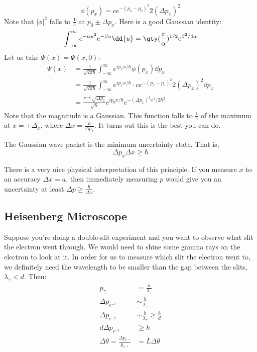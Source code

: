 \[ \phi(p_x) = c e^{-(p_x - p_0)^2}{2 (\Delta p_x)^2} \]
Note that $|\phi|^2$ falls to $\frac{1}{e}$ at $p_0 \pm \Delta p_x$. Here is a good Gaussian identity:
\[ \int_{-\infty}^{\infty} e^{-\alpha u^2} e^{-\beta u} \dd{u} = \qty(\frac{\pi}{\alpha})^{1/2} e^{\beta^2/4\alpha} \]
Let us take $\Psi(x) = \Psi(x, 0)$:
\begin{align*}
    \Psi(x) &= \frac{1}{\sqrt{2\pi\hbar}} \int_{-\infty}^{\infty} e^{i p_x x/\hbar} \phi(p_x) \dd{p_x} \\
    &= \frac{1}{\sqrt{2\pi\hbar}} \int_{-\infty}^{\infty} e^{i p_x x/\hbar} \cdot c e^{-(p_x - p_0)^2}{2 (\Delta p_x)^2} \dd{p_x} \\
    &= \frac{\pi^{-\frac{1}{4}} \sqrt{\Delta p_x}}{\sqrt{\hbar}}  e^{i p_0 x / \hbar} e^{-(\Delta p_x)^2 x^2 / 2 \hbar^2}
\end{align*}
Note that the magnitude is a Gaussian. This function falls to $\frac{1}{e}$ of the maximum at $x = \pm \Delta_x$, where
$\Delta x = \frac{\hbar}{\Delta p_x}$. It turns out this is the best you can do.

\begin{theorem}
    The Gaussian wave packet is the minimum uncertainty state. That is,
    \[ \Delta p_x \Delta x \geq \hbar \]
\end{theorem}

There is a very nice physical interpretation of this principle. If you measure $x$ to an accuracy $\Delta x = a$, then
immediately measuring $p$ would give you an uncertainty at least $\Delta p \geq \frac{\hbar}{\Delta x}$.

\subsection{Heisenberg Microscope}
Suppose you're doing a double-slit experiment and you want to observe what slit the electron went through. We would need to shine some gamma rays
on the electron to look at it. In order for us to measure which slit the electron went to, we definitely need the wavelength to be smaller than the gap between the slits,
$\lambda_{\gamma} < d$. Then:
\begin{align*}
    p_{\gamma} &= \frac{h}{\lambda_{\gamma}} \\
    \Delta p_{e^{-1}} &\sim \frac{h}{\lambda_{\gamma}} \\
    \Delta p_{e^{-1}} &\sim \frac{h}{\lambda_{\gamma}} \geq \frac{h}{d} \\
    d \Delta p_{e^{-1}} &\geq h \\
    \Delta \theta = \frac{\Delta p_{e^{-1}}}{p_{e^{-1}}} &= L \Delta \theta
\end{align*}